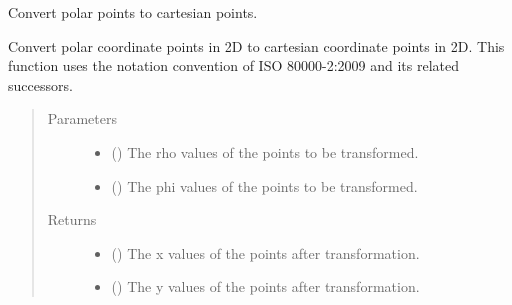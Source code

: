 \documentclass[letterpaper,10pt,english]{sphinxmanual}
\begin{document}

\begin{fulllineitems}
\label{\detokenize{Backend.coordinate_system_transformation:Backend.coordinate_system_transformation.polar_to_cartesian_2d}}
Convert polar points to cartesian points.

Convert polar coordinate points in 2D to cartesian coordinate points in 2D.
This function uses the notation convention of ISO 80000-2:2009 and its
related successors.
\begin{quote}\begin{description}
\item[{Parameters}] \leavevmode\begin{itemize}
\item {} 
 () \textendash{} The rho values of the points to be transformed.

\item {} 
 () \textendash{} The phi values of the points to be transformed.

\end{itemize}

\item[{Returns}] \leavevmode
\begin{itemize}
\item {} 
 () \textendash{} The x values of the points after transformation.

\item {} 
 () \textendash{} The y values of the points after transformation.

\end{itemize}


\end{description}\end{quote}

\end{fulllineitems}

\end{document}
